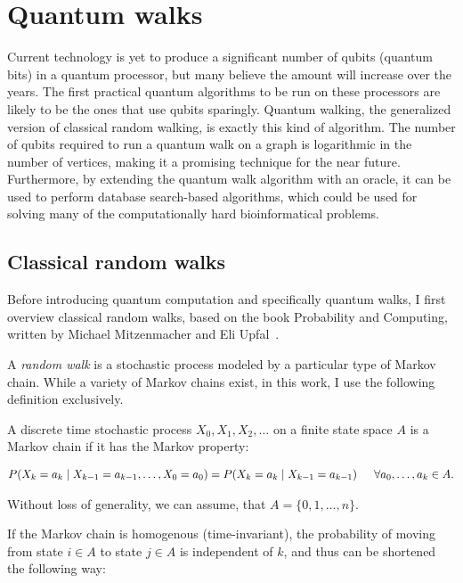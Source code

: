 \chapter{Quantum walks}

Current technology is yet to produce a significant number of qubits (quantum bits) in a quantum processor, but many believe the amount will increase over the years. The first practical quantum algorithms to be run on these processors are likely to be the ones that use qubits sparingly. Quantum walking, the generalized version of classical random walking, is exactly this kind of algorithm. The number of qubits required to run a quantum walk on a graph is logarithmic in the number of vertices, making it a promising technique for the near future. Furthermore, by extending the quantum walk algorithm with an oracle, it can be used to perform database search-based algorithms, which could be used for solving many of the computationally hard bioinformatical problems.

\section{Classical random walks}

Before introducing quantum computation and specifically quantum walks, I first overview classical random walks, based on the book Probability and Computing, written by Michael Mitzenmacher and Eli Upfal~\cite{MitzenmacherProbability}.

A \textit{random walk} is a stochastic process modeled by a particular type of Markov chain. While a variety of Markov chains exist, in this work, I use the following definition exclusively.

\begin{definition}

A discrete time stochastic process $X_0, X_1, X_2, \dots$ on a finite state space $A$ is a Markov chain if it has the Markov property:

\begin{align*}
P(X_k = a_k \mid X_{k-1} = a_{k-1}, \dots, X_0 = a_0) = P(X_k = a_k \mid X_{k-1} = a_{k-1}) \hspace{15pt} \forall a_0,\dots,a_k\in A.
\end{align*}

\end{definition}

Without loss of generality, we can assume, that $A = \{0,1,\dots,n\}$.

If the Markov chain is homogenous (time-invariant), the probability of moving from state $i \in A$ to state $j \in A$ is independent of $k$, and thus can be shortened the following way:

